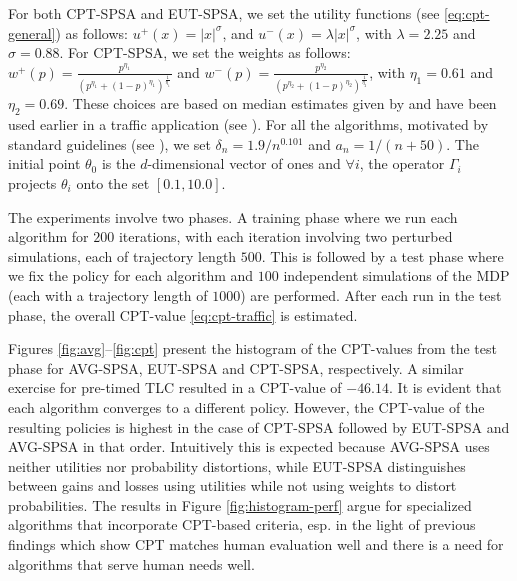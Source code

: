 For both CPT-SPSA and EUT-SPSA, we set the utility functions (see \eqref{eq:cpt-general}) as follows:
$u^+(x) =  |x|^{\sigma}$, and  $u^-(x) = \lambda |x|^{\sigma}$, with $\lambda = 2.25$ and $\sigma = 0.88$.
For CPT-SPSA, we set the weights as follows:
$w^+(p) = \frac{p^{\eta_1}}{{(p^{\eta_1}+ (1-p)^{\eta_1})}^{\frac{1}{\eta_1}}}$ and  
$w^-(p) = \frac{p^{\eta_2}}{{(p^{\eta_2}+ (1-p)^{\eta_2})}^{\frac{1}{\eta_2}}}$, with
$\eta_1 = 0.61$ and $\eta_2 = 0.69$. These choices are based on median estimates given by \cite{tversky1992advances} and have been used earlier in a traffic application (see \cite{gao2010adaptive}).
For all the algorithms,
 motivated by standard guidelines (see \citealt{spall2005introduction}),
 we set $\delta_n = 1.9/n^{0.101}$ and $a_n = 1/(n+50)$. The initial point $\theta_0$ is the $d$-dimensional vector of ones and $\forall i$, the operator $\Gamma_i$ projects $\theta_i$ onto the set $[0.1, 10.0]$.
    
The experiments involve two phases.
A training phase where we run each algorithm for $200$ iterations, with each iteration involving two perturbed simulations, each of trajectory length $500$. This is followed by a test phase where we fix the policy for each algorithm and $100$ independent simulations of the MDP (each with a trajectory length of $1000$) are performed. After each run in the test phase, the overall CPT-value \eqref{eq:cpt-traffic} is estimated. 

Figures \ref{fig:avg}--\ref{fig:cpt} present the histogram of the CPT-values from the test phase for AVG-SPSA, EUT-SPSA and CPT-SPSA, respectively.  A similar exercise for pre-timed TLC resulted in a CPT-value of $-46.14$. It is evident that each algorithm converges to a different policy. However, the CPT-value of the resulting policies is highest in the case of CPT-SPSA followed by EUT-SPSA and AVG-SPSA in that order. Intuitively this is expected because AVG-SPSA uses neither utilities nor probability distortions, while EUT-SPSA distinguishes between gains and losses using utilities while not using weights to distort probabilities.
The results in Figure \ref{fig:histogram-perf} argue for specialized algorithms that incorporate CPT-based criteria, esp. in the light of previous findings which show CPT matches human evaluation well and there is a need for algorithms that serve human needs well.

